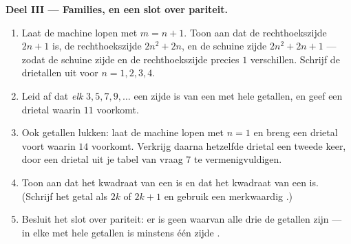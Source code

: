 \begin{problem}[{Weekendopgave --- rechthoekige driehoeken met hele getallen,
en het merkwaardige product $(m^2 - n^2)^2 + (2mn)^2 = (m^2 + n^2)^2$ dat ze
allemaal voortbrengt}]
\medskip
\noindent\textbf{Deel III --- Families, en een slot over pariteit.}
\begin{enumerate}[resume]
  \item Laat de machine lopen met $m = n + 1$. Toon aan dat de 
        rechthoekszijde $2n + 1$ is, de  rechthoekszijde $2n^2 + 2n$, en de
        schuine zijde $2n^2 + 2n + 1$ --- zodat de schuine zijde en de 
        rechthoekszijde precies $1$ verschillen. Schrijf de drietallen uit voor
        $n = 1, 2, 3, 4$.
  \item Leid af dat \emph{elk}  $3, 5, 7, 9, \dots$ een zijde is van
        een  met hele getallen, en geef een drietal waarin
        $11$ voorkomt.
  \item Ook  getallen lukken: laat de machine lopen met $n = 1$ en breng een
        drietal voort waarin $14$ voorkomt. Verkrijg daarna hetzelfde drietal een
        tweede keer, door een drietal uit je tabel van vraag 7 te
        vermenigvuldigen.
  \item Toon aan dat het kwadraat van een   is en dat het kwadraat
        van een   is. (Schrijf het getal als $2k$ of $2k + 1$
        en gebruik een merkwaardig .)
  \item Besluit het slot over pariteit: er is geen  waarvan
        alle drie de getallen  zijn --- in elke  met
        hele getallen is minstens één zijde .
\end{enumerate}
\end{problem}
